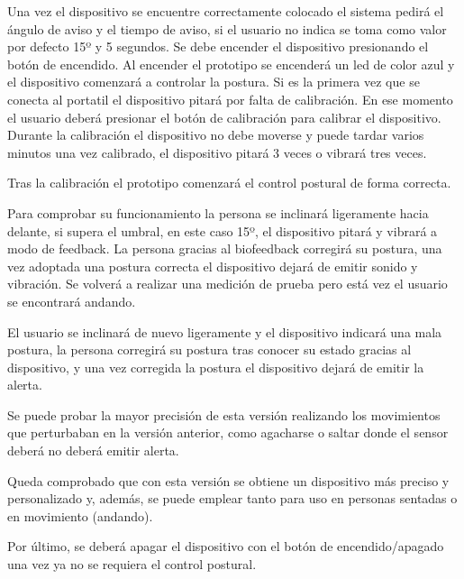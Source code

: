Una vez el dispositivo se encuentre correctamente colocado el sistema pedirá el ángulo de aviso y el tiempo de aviso, si el usuario no indica se toma como valor por defecto 15º y 5 segundos. Se debe encender el dispositivo presionando el botón de encendido. Al encender el prototipo se encenderá un led de color azul y el dispositivo comenzará a controlar la postura. Si es la primera vez que se conecta al portatil el dispositivo pitará por falta de calibración. En ese momento el usuario deberá presionar el botón de calibración para calibrar el dispositivo. Durante la calibración el dispositivo no debe moverse y puede tardar varios minutos una vez calibrado, el dispositivo pitará 3 veces o vibrará tres veces.

Tras la calibración el prototipo comenzará el control postural de forma correcta.

Para comprobar su funcionamiento la persona se inclinará ligeramente hacia delante, si supera el umbral, en este caso 15º, el dispositivo pitará y vibrará a modo de feedback. La persona gracias al biofeedback corregirá su postura, una vez adoptada una postura correcta el dispositivo dejará de emitir sonido y vibración. Se volverá a realizar una medición de prueba pero está vez el usuario se encontrará andando.

El usuario se inclinará de nuevo ligeramente y el dispositivo indicará una mala postura, la persona corregirá su postura tras conocer su estado gracias al dispositivo, y una vez corregida la postura el dispositivo dejará de emitir la alerta.

Se puede probar la mayor precisión de esta versión realizando los movimientos que perturbaban en la versión anterior, como agacharse o saltar donde el sensor deberá no deberá emitir alerta.

Queda comprobado que con esta versión se obtiene un dispositivo más preciso y personalizado y, además, se puede emplear tanto para uso en personas sentadas o en movimiento (andando).

Por último, se deberá apagar el dispositivo con el botón de encendido/apagado una vez ya no se requiera el control postural.

